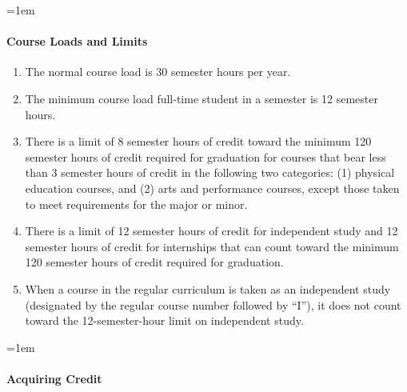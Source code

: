 \documentclass{manual}
\newcommand{\modified}[1]{}
\let\oldparagraph\paragraph
\renewcommand\paragraph{\leftskip=1em\oldparagraph}
\newcommand{\itemLevelA}{\alph*.}
\newcommand{\itemRefA}{\alph*}
\begin{document}
\paragraph{Course Loads and Limits}

\begin{enumerate}[label=\itemLevelA,ref=\itemRefA]
\item  The normal course load is 30 semester hours per year. 
\item The minimum course load         \modified{4/12/98}  full-time student in a semester is 12 semester hours. 
\item There is a limit of 8 semester hours of credit toward the minimum 120 semester hours of credit required for graduation for courses that bear less than 3 semester hours of credit in the following two categories: (1) physical education courses, and (2) arts and performance courses, except those taken to meet requirements for the major or minor. 
\item There is a limit of 12 semester hours of credit for independent study and 12 semester hours of credit for internships that can count toward the minimum 120 semester hours of credit required for graduation. 
\item When a course in the regular curriculum is taken as an independent study (designated by the regular course number followed by ``I''), it does not count toward the 12-semester-hour limit on independent study.
\end{enumerate}

\paragraph{Acquiring Credit}\label{par:AcquiringCredit}
\end{document}
